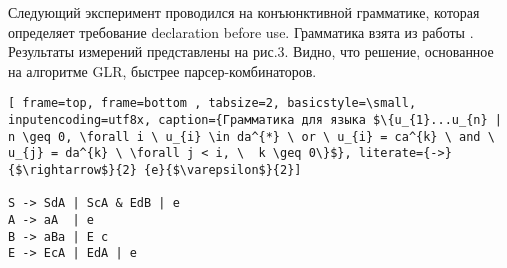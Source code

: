 \documentclass[14pt]{matmex-diploma}
\begin{document}
Следующий эксперимент проводился на конъюнктивной грамматике, которая определяет требование declaration before use. Грамматика взята из работы \cite{okhotin2013conjunctive}. Результаты измерений представлены на рис.3. Видно, что решение, основанное на алгоритме GLR, быстрее парсер-комбинаторов.

\begin{lstlisting}[ frame=top, frame=bottom , tabsize=2, basicstyle=\small, inputencoding=utf8x, caption={Грамматика для языка $\{u_{1}...u_{n} | n \geq 0, \forall i \ u_{i} \in da^{*} \ or \ u_{i} = ca^{k} \ and \ u_{j} = da^{k} \ \forall j < i, \  k \geq 0\}$}, literate={->}{$\rightarrow$}{2} {e}{$\varepsilon$}{2}]

S -> SdA | ScA & EdB | e
A -> aA  | e
B -> aBa | E c
E -> EcA | EdA | e
\end{lstlisting}
\end{document}
